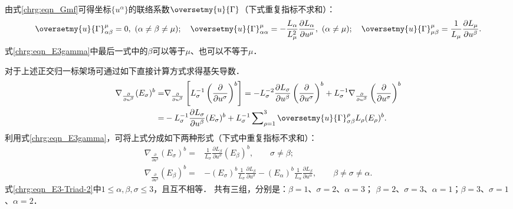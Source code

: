 由式\eqref{chrg:eqn_Gmf}可得坐标$\{u^\alpha\}$的联络系数$\oversetmy{u}{\Gamma}$（下式重复指标不求和）：
\begin{equation}\label{chrg:eqn_E3gamma}
    \oversetmy{u}{\Gamma}^\mu_{\alpha\beta}= 0, \ (\alpha\neq \beta \neq \mu) ; \quad
    \oversetmy{u}{\Gamma}^\mu_{\alpha \alpha}= - \frac{L_\alpha}{L_\mu^2} 
    \frac{\partial L_\alpha}{\partial u^\mu} , \ (\alpha \neq \mu) ; \quad
    \oversetmy{u}{\Gamma}^\mu_{\mu \beta}= \frac{1}{L_\mu} \frac{\partial L_\mu}{\partial u^\beta} .
\end{equation}  %
式\eqref{chrg:eqn_E3gamma}中最后一式中的$\beta$可以等于$\mu$、也可以不等于$\mu$．


对于上述正交归一标架场可通过如下直接计算方式求得基矢导数．
\begin{align*}
    \nabla_{\frac{\partial }{\partial u^\beta}} (E_\sigma)^b = & \nabla_{\frac{\partial }{\partial u^\beta}}
    \left[ L_{\sigma}^{-1} \left(\frac{\partial}{\partial u^\sigma}\right)^b \right]
    =-L_{\sigma}^{-2} \frac{\partial L_{\sigma}}{\partial u^\beta}\left(\frac{\partial}{\partial u^\sigma}\right)^b
    +L_{\sigma}^{-1} \nabla_{\frac{\partial }{\partial u^\beta}} \left(\frac{\partial}{\partial u^\sigma}\right)^b \\
    =&-L_{\sigma}^{-1} \frac{\partial L_{\sigma}}{\partial u^\beta} (E_\sigma)^b
    +L_{\sigma}^{-1}  \sum\nolimits_{\rho=1}^{3} \oversetmy{u}{\Gamma}^\rho_{\sigma\beta} L_{\rho} (E_\rho)^b  .
\end{align*}
利用式\eqref{chrg:eqn_E3gamma}，可将上式分成如下两种形式（下式中重复指标不求和）：
\begin{subequations}\label{chrg:eqn_E3-Triad}
    \begin{align}    
        \nabla_{\frac{\partial }{\partial u^\beta}} (E_\sigma)^b  = &
        \frac{1}{L_\sigma} \frac{\partial L_\beta}{\partial u^\sigma} (E_\beta)^b  ,
        \qquad \sigma\neq \beta ; \label{chrg:eqn_E3-Triad-1}\\
        \nabla _{\frac{\partial }{\partial u^\beta}} (E_\beta)^b =& 
        - (E_\sigma)^b \frac{1}{L_\sigma} \frac{\partial L_\beta}{\partial u^\sigma} 
        - (E_\alpha)^b \frac{1}{L_\alpha} \frac{\partial L_\beta}{\partial u^\alpha},
        \qquad \beta\neq \sigma \neq \alpha . \label{chrg:eqn_E3-Triad-2}
    \end{align}    
\end{subequations}
式\eqref{chrg:eqn_E3-Triad-2}中$1\leqslant \alpha,\beta,\sigma \leqslant 3$，且互不相等．
共有三组，分别是：$\beta=1$、$\sigma=2$、$\alpha=3$；
$\beta=2$、$\sigma=3$、$\alpha=1$；$\beta=3$、$\sigma=1$、$\alpha=2$．


